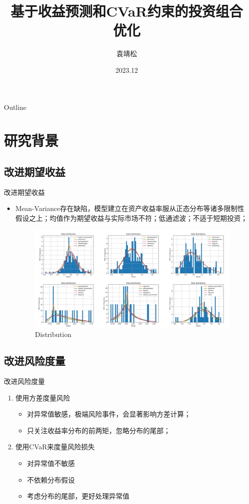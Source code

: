 \documentclass[CJK,aspectratio=43]{beamer}  %
\title[投资组合优化]{基于收益预测和CVaR约束的投资组合优化}
\author{袁靖松}
\institute{金融数学专题展示}
\date{2023.12}
\begin{document}
	\begin{frame}
		\titlepage
	\end{frame}
	\begin{frame}{Outline}
	\end{frame}
\section{研究背景}
\subsection{改进期望收益}
	\begin{frame}{改进期望收益}
			\begin{itemize}
				\item Mean-Variance存在缺陷，模型建立在资产收益率服从正态分布等诸多限制性假设之上；均值作为期望收益与实际市场不符；低通滤波；不适于短期投资；
			\begin{figure}
				\centering
				\includegraphics[width=0.9\linewidth]{"pic/distribution of random six"}
				\caption{Distribution}
				\label{fig:distribution-of-random-stock}
			\end{figure}
			\end{itemize}
	\end{frame}
\subsection{改进风险度量}
	\begin{frame}{改进风险度量}
		\begin{enumerate}
			\item 使用方差度量风险
			\begin{itemize}
				\item 对异常值敏感，极端风险事件，会显著影响方差计算；
				\item 只关注收益率分布的前两矩，忽略分布的尾部；
			\end{itemize}
			\item 使用CVaR来度量风险损失
			\begin{itemize}
				\item 对异常值不敏感
				\item 不依赖分布假设
				\item 考虑分布的尾部，更好处理异常值
			\end{itemize}
		\end{enumerate}
	\end{frame}
\end{document}
